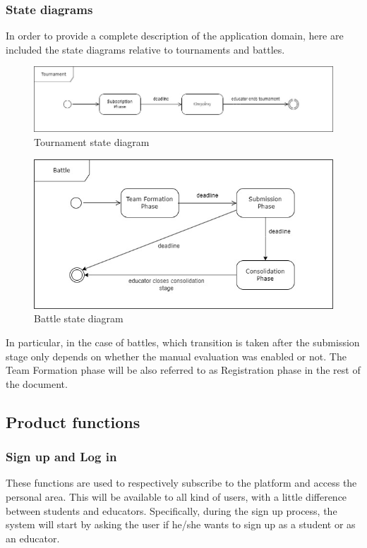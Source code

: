 \subsubsection{State diagrams}
In order to provide a complete description of the application domain, here are included the state diagrams relative to tournaments and battles.
\begin{figure}[H]
    \hspace{-0.8cm}
    \includegraphics[scale=0.5]{Diagrams/tournament_state.jpg}
    \caption{Tournament state diagram}
    \label{tournament_state}
\end{figure}
\begin{figure}[H]
    \hspace{35px}
    \includegraphics[scale=0.5]{Diagrams/battle_state.jpg}
    \caption{Battle state diagram}
    \label{battle_state}
\end{figure}
In particular, in the case of battles, which transition is taken after the submission stage only depends on whether the manual evaluation was enabled or not.
The Team Formation phase will be also referred to as Registration phase in the rest of the document.

\subsection{Product functions}
\subsubsection{Sign up and Log in}
These functions are used to respectively subscribe to the platform and access the personal area. This will be available to all kind of users, with a little difference between students and educators. Specifically, during the sign up process, the system will start by asking the user if he/she wants to sign up as a student or as an educator.

